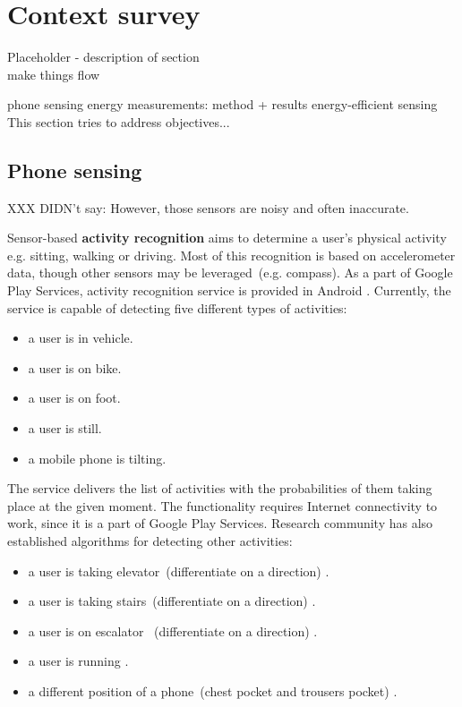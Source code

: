 \section{Context survey}
\label{s:contextsurvey}
Placeholder - description of section\\ make things flow

phone sensing
energy measurements: method + results
energy-efficient sensing
This section tries to address objectives...

\subsection{Phone sensing}

XXX DIDN't say: However, those sensors are noisy and often inaccurate. 


Sensor-based \textbf{activity recognition} aims to determine a user's physical activity e.g. sitting, walking or driving. Most of this recognition is based on accelerometer data, though other sensors may be leveraged\ (e.g. compass). As a part of Google Play Services, activity recognition service is provided in Android \cite{android:activityrecognition}. Currently, the service is capable of detecting five different types of activities: 
 \begin{itemize}
  	\item a user is in vehicle.
    \item a user is on bike.
    \item a user is on foot.
    \item a user is still.
    \item a mobile phone is tilting.
  \end{itemize}
  
The service delivers the list of activities with the probabilities of them taking place at the given moment. The functionality requires Internet connectivity to work, since it is a part of Google Play Services. Research community has also established algorithms for detecting other activities:

 \begin{itemize}
  	\item a user is taking elevator\ (differentiate on a direction) \cite{Wang:unsupervised}.
    \item a user is taking stairs\ (differentiate on a direction) \cite{Wang:unsupervised}.
    \item a user is on escalator \ (differentiate on a direction) \cite{Wang:unsupervised}.
    \item a user is running \cite{miluzzo:cenceme}.
    \item a different position of a phone\ (chest pocket and trousers pocket) \cite{kawahara:positions}.
  \end{itemize}

